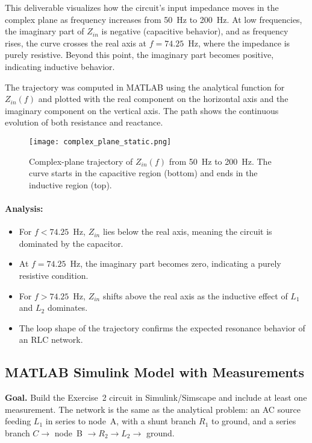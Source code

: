 \documentclass{article}
\begin{document}
This deliverable visualizes how the circuit’s input impedance 
moves in the complex plane as frequency increases from 50~Hz to 200~Hz. 
At low frequencies, the imaginary part of $Z_{in}$ is negative (capacitive behavior), 
and as frequency rises, the curve crosses the real axis 
at $f=74.25$~Hz, where the impedance is purely resistive. 
Beyond this point, the imaginary part becomes positive, indicating inductive behavior.

\noindent
The trajectory was computed in MATLAB using the analytical function for $Z_{in}(f)$ 
and plotted with the real component on the horizontal axis 
and the imaginary component on the vertical axis. 
The path shows the continuous evolution of both resistance and reactance.

\begin{figure}[H]
  \centering
  \texttt{[image: complex\_plane\_static.png]}
  \caption{Complex-plane trajectory of $Z_{in}(f)$ from 50~Hz to 200~Hz. 
  The curve starts in the capacitive region (bottom) and ends in the inductive region (top).}
\end{figure}


\paragraph{Analysis:}
\begin{itemize}
  \item For $f < 74.25$~Hz, $Z_{in}$ lies below the real axis, meaning the circuit is dominated by the capacitor.
  \item At $f = 74.25$~Hz, the imaginary part becomes zero, indicating a purely resistive condition.
  \item For $f > 74.25$~Hz, $Z_{in}$ shifts above the real axis as the inductive effect of $L_1$ and $L_2$ dominates.
  \item The loop shape of the trajectory confirms the expected resonance behavior of an RLC network.
\end{itemize}


\subsection{MATLAB Simulink Model with Measurements}

\textbf{Goal.} Build the Exercise~2 circuit in Simulink/Simscape and include at least one measurement.  
The network is the same as the analytical problem: an AC source feeding $L_1$ in series to node~A, with a shunt branch $R_1$ to ground, and a series branch $C \rightarrow$ node~B $\rightarrow R_2 \rightarrow L_2 \rightarrow$ ground.
\end{document}
